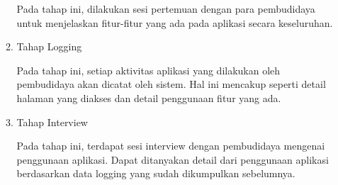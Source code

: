 \begin{spacing}{1.5}
\begin{enumerate}
\begin{enumerate}
		Pada tahap ini, dilakukan sesi pertemuan dengan para pembudidaya untuk menjelaskan fitur-fitur yang ada pada aplikasi secara keseluruhan.

		\item Tahap Logging
		
		Pada tahap ini, setiap aktivitas aplikasi yang dilakukan oleh pembudidaya akan dicatat oleh sistem. Hal ini mencakup seperti detail halaman yang diakses dan detail penggunaan fitur yang ada.
	
		\item Tahap Interview
		
		Pada tahap ini, terdapat sesi interview dengan pembudidaya mengenai penggunaan aplikasi. Dapat ditanyakan detail dari penggunaan aplikasi berdasarkan data logging yang sudah dikumpulkan sebelumnya.
	\end{enumerate}

	


\end{enumerate}
\end{spacing}
